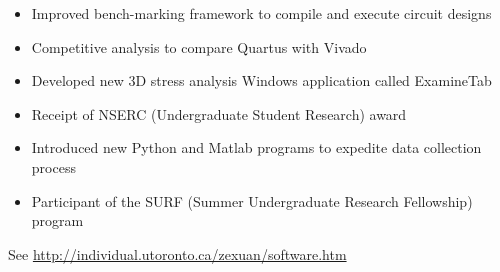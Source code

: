 \documentclass[10pt,a4paper,normalphoto]{altacv}
\begin{document}
\begin{paracol}{2}
            \begin{itemize}
                \item Improved bench-marking framework to compile and execute circuit designs
                \item Competitive analysis to compare Quartus with Vivado
            \end{itemize}
            \divider
            
            \begin{itemize}
                \item Developed new 3D stress analysis Windows application called ExamineTab
                \item Receipt of NSERC (Undergraduate Student Research) award
            \end{itemize}
            \divider
            
            \begin{itemize}
                \item Introduced new Python and Matlab programs to expedite data collection process
                \item Participant of the SURF (Summer Undergraduate Research Fellowship) program
            \end{itemize}
            \divider
        
        
            See \href{http://individual.utoronto.ca/zexuan/software.htm}{http://individual.utoronto.ca/zexuan/software.htm}
    \end{paracol}
\end{document}

